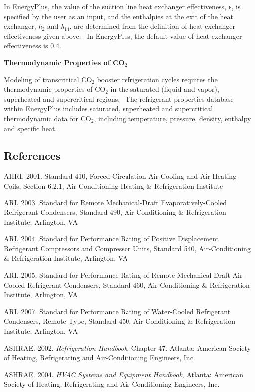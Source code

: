 In EnergyPlus, the value of the suction line heat exchanger effectiveness, ε, is specified by the user as an input, and the enthalpies at the exit of the heat exchanger, \emph{h}\(_{2}\) and \emph{h}\(_{14}\), are determined from the definition of heat exchanger effectiveness given above.~ In EnergyPlus, the default value of heat exchanger effectiveness is 0.4.

\textbf{Thermodynamic Properties of CO\(_{2}\)}

Modeling of transcritical CO\(_{2}\) booster refrigeration cycles requires the thermodynamic properties of CO\(_{2}\) in the saturated (liquid and vapor), superheated and supercritical regions.~ The refrigerant properties database within EnergyPlus includes saturated, superheated and supercritical thermodynamic data for CO\(_{2}\), including temperature, pressure, density, enthalpy and specific heat.

\subsection{References}\label{references-040}

AHRI, 2001. Standard 410, Forced-Circulation Air-Cooling and Air-Heating Coils, Section 6.2.1, Air-Conditioning Heating \& Refrigeration Institute

ARI. 2003. Standard for Remote Mechanical-Draft Evaporatively-Cooled Refrigerant Condensers, Standard 490, Air-Conditioning \& Refrigeration Institute, Arlington, VA

ARI. 2004. Standard for Performance Rating of Positive Displacement Refrigerant Compressors and Compressor Units, Standard 540, Air-Conditioning \& Refrigeration Institute, Arlington, VA

ARI. 2005. Standard for Performance Rating of Remote Mechanical-Draft Air-Cooled Refrigerant Condensers, Standard 460, Air-Conditioning \& Refrigeration Institute, Arlington, VA

ARI. 2007. Standard for Performance Rating of Water-Cooled Refrigerant Condensers, Remote Type, Standard 450, Air-Conditioning \& Refrigeration Institute, Arlington, VA

ASHRAE. 2002. \emph{Refrigeration Handbook}, Chapter 47. Atlanta: American Society of Heating, Refrigerating and Air-Conditioning Engineers, Inc.

ASHRAE. 2004. \emph{HVAC Systems and Equipment Handbook}, Atlanta: American Society of Heating, Refrigerating and Air-Conditioning Engineers, Inc.


